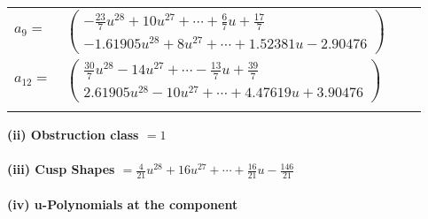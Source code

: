 \documentclass[1p]{elsarticle_modified}
\theoremstyle{definition}
\begin{document}
\begin{tabular}{m{7pt} m{180pt} m{7pt} m{180pt} }
\flushright $a_{9}=$&$\begin{pmatrix}-\frac{23}{7} u^{28}+10 u^{27}+\cdots+\frac{6}{7} u+\frac{17}{7}\\-1.61905 u^{28}+8 u^{27}+\cdots+1.52381 u-2.90476\end{pmatrix}$ \\
\flushright $a_{12}=$&$\begin{pmatrix}\frac{30}{7} u^{28}-14 u^{27}+\cdots-\frac{13}{7} u+\frac{39}{7}\\2.61905 u^{28}-10 u^{27}+\cdots+4.47619 u+3.90476\end{pmatrix}$\\&\end{tabular}
\flushleft \textbf{(ii) Obstruction class $= 1$}\\~\\
\flushleft \textbf{(iii) Cusp Shapes $= \frac{4}{21} u^{28}+16 u^{27}+\cdots+\frac{16}{21} u-\frac{146}{21}$}\\~\\
\newpage\renewcommand{\arraystretch}{1}
\flushleft \textbf{(iv) u-Polynomials at the component}\newline \\
\end{document}
